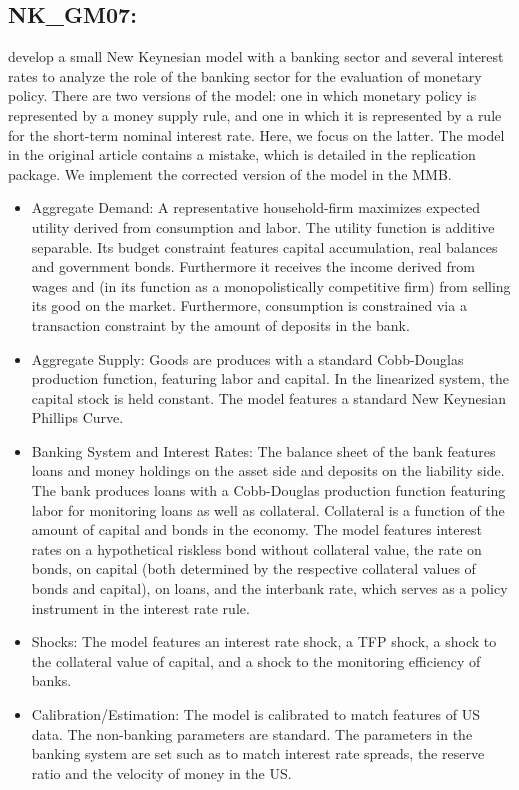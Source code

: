 \documentclass[11pt,a4paper]{article}
\begin{document}
	\subsection{NK\_GM07: \texorpdfstring{\cite{goodfriend2007banking}}{Goodfriend and McCallum (2007)}}
	\label{NKGM07}
	\cite{goodfriend2007banking} develop a small New Keynesian model with a banking sector and several interest rates to analyze the role of the banking sector for the evaluation of monetary policy. There are two versions of the model: one in which monetary policy is represented by a money supply rule, and one in which it is represented by a rule for the short-term nominal interest rate. Here, we focus on the latter. The model in the original article contains a mistake, which is detailed in the replication package. We implement the corrected version of the model in the MMB.
	\begin{itemize}
		\item Aggregate Demand: A representative household-firm maximizes expected utility derived from consumption and labor. The utility function is additive separable. Its budget constraint features capital accumulation, real balances and government bonds. Furthermore it receives the income derived from wages and (in its function as a monopolistically competitive firm) from selling its good on the market. Furthermore, consumption is constrained via a transaction constraint by the amount of deposits in the bank.   
		\item Aggregate Supply: Goods are produces with a standard Cobb-Douglas production function, featuring labor and capital. In the linearized system, the capital stock is held constant. The model features a standard New Keynesian Phillips Curve.
		\item Banking System and Interest Rates: The balance sheet of the bank features loans and money holdings on the asset side and deposits on the liability side. The bank produces loans with a Cobb-Douglas production function featuring labor for monitoring loans as well as collateral. Collateral is a function of the amount of capital and bonds in the economy. The model features interest rates on a hypothetical riskless bond without collateral value, the rate on bonds, on capital (both determined by the respective collateral values of bonds and capital), on loans, and the interbank rate, which serves as a policy instrument in the interest rate rule.
		\item Shocks: The model features an interest rate shock, a TFP shock, a shock to the collateral value of capital, and a shock to the monitoring efficiency of banks.
		\item Calibration/Estimation: The model is calibrated to match features of US data. The non-banking parameters are standard. The parameters in the banking system are set such as to match interest rate spreads, the reserve ratio and the velocity of money in the US.
	\end{itemize}
	
\end{document}
